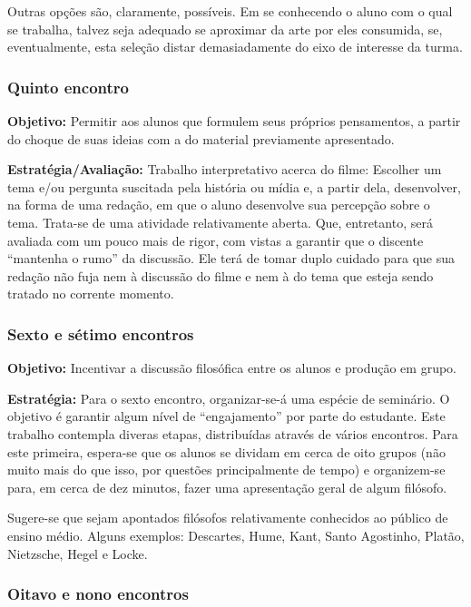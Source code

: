 \documentclass[12pt,a4paper]{article}
\begin{document}
	Outras opções são, claramente, possíveis. Em se conhecendo 
	o aluno com o qual se trabalha, talvez seja adequado se 
	aproximar da arte por eles consumida, se, eventualmente, 
	esta seleção distar demasiadamente do eixo de interesse 
	da turma. 

	\subsubsection{Quinto encontro}
	
	\textbf{Objetivo:} Permitir aos alunos que formulem seus 
	próprios pensamentos, a partir do choque de suas ideias 
	com a do material previamente apresentado. 

	\textbf{Estratégia/Avaliação:}
	Trabalho interpretativo acerca do filme: 
	Escolher um tema e/ou pergunta suscitada pela história ou 
	mídia e, a partir dela, desenvolver, na forma de uma redação, 
	em que o aluno desenvolve sua percepção sobre o tema. Trata-se 
	de uma atividade relativamente aberta. Que, entretanto, será 
	avaliada com um pouco mais de rigor, com vistas a garantir 
	que o discente ``mantenha o rumo'' da discussão. Ele terá de 
	tomar duplo cuidado para que sua redação não fuja nem à 
	discussão do filme e nem à do tema que esteja sendo tratado 
	no corrente momento. 

	\subsubsection{Sexto e sétimo encontros}
	
	\textbf{Objetivo:} Incentivar a discussão filosófica entre 
	os alunos e produção em grupo. 

	\textbf{Estratégia:}
	Para o sexto encontro, organizar-se-á uma espécie de seminário. 
	O objetivo é garantir algum nível de ``engajamento'' por parte 
	do estudante. Este trabalho contempla diveras etapas, distribuídas 
	através de vários encontros. Para este primeira, espera-se que 
	os alunos se dividam em cerca de oito grupos (não muito mais do que 
	isso, por questões principalmente de tempo) e organizem-se para, 
	em cerca de dez minutos, fazer uma apresentação geral de algum
	filósofo. 
	
	Sugere-se que sejam apontados filósofos relativamente conhecidos 
	ao público de ensino médio. Alguns exemplos: Descartes, Hume, 
	Kant, Santo Agostinho, Platão, Nietzsche, Hegel e Locke. 
	
	\subsubsection{Oitavo e nono encontros}
	
\end{document}
